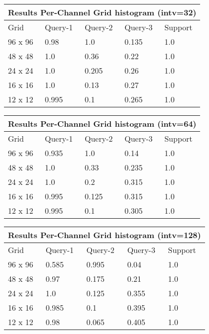 \documentclass[12pt]{article}
\begin{document}
\begin{tabular}{ |p{1.5cm}||p{2cm}|p{2cm}|p{2cm}|p{2cm}|  }
    \hline
    \multicolumn{5}{|c|}{Results Per-Channel Grid histogram (intv=32)} \\
    \hline
    Grid & Query-1 & Query-2 & Query-3 & Support \\
    \hline
    96 x 96 & 0.98 & 1.0 & 0.135 & 1.0 \\
    \hline
    48 x 48 & 1.0 & 0.36 & 0.22 & 1.0 \\
    \hline
    24 x 24 & 1.0 & 0.205 & 0.26 & 1.0 \\
    \hline
    16 x 16 & 1.0 & 0.13 & 0.27 & 1.0 \\
    \hline
    12 x 12 & 0.995 & 0.1 & 0.265 & 1.0 \\
    \hline
\end{tabular}

\begin{tabular}{ |p{1.5cm}||p{2cm}|p{2cm}|p{2cm}|p{2cm}|  }
    \hline
    \multicolumn{5}{|c|}{Results Per-Channel Grid histogram (intv=64)} \\
    \hline
    Grid & Query-1 & Query-2 & Query-3 & Support \\
    \hline
    96 x 96 & 0.935 & 1.0 & 0.14 & 1.0 \\
    \hline
    48 x 48 & 1.0 & 0.33 & 0.235 & 1.0 \\
    \hline
    24 x 24 & 1.0 & 0.2 & 0.315 & 1.0 \\
    \hline
    16 x 16 & 0.995 & 0.125 & 0.315 & 1.0 \\
    \hline
    12 x 12 & 0.995 & 0.1 & 0.305 & 1.0 \\
    \hline
\end{tabular}

\begin{tabular}{ |p{1.5cm}||p{2cm}|p{2cm}|p{2cm}|p{2cm}|  }
    \hline
    \multicolumn{5}{|c|}{Results Per-Channel Grid histogram (intv=128)} \\
    \hline
    Grid & Query-1 & Query-2 & Query-3 & Support \\
    \hline
    96 x 96 & 0.585 & 0.995 & 0.04 & 1.0 \\
    \hline
    48 x 48 & 0.97 & 0.175 & 0.21 & 1.0 \\
    \hline
    24 x 24 & 1.0 & 0.125 & 0.355 & 1.0 \\
    \hline
    16 x 16 & 0.985 & 0.1 & 0.395 & 1.0 \\
    \hline
    12 x 12 & 0.98 & 0.065 & 0.405 & 1.0 \\
    \hline
\end{tabular}
\end{document}
